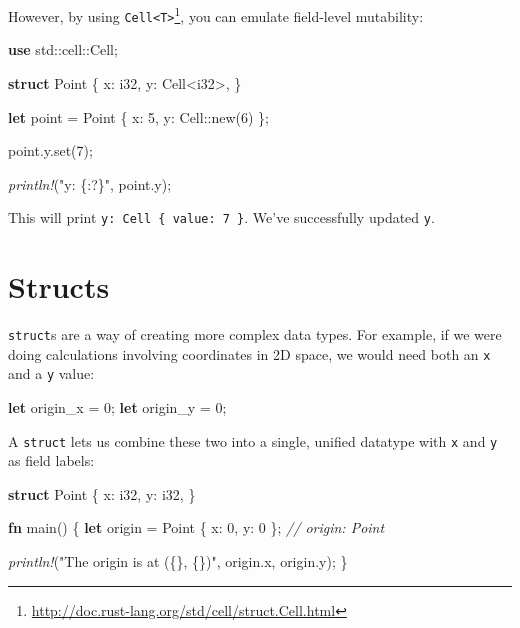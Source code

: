 \documentclass[a4paper,]{book}
\newenvironment{Shaded}{\begin{snugshade}}{\end{snugshade}}
\newcommand{\KeywordTok}[1]{\textcolor[rgb]{0.13,0.29,0.53}{\textbf{{#1}}}}
\newcommand{\DataTypeTok}[1]{\textcolor[rgb]{0.13,0.29,0.53}{{#1}}}
\newcommand{\DecValTok}[1]{\textcolor[rgb]{0.00,0.00,0.81}{{#1}}}
\newcommand{\StringTok}[1]{\textcolor[rgb]{0.31,0.60,0.02}{{#1}}}
\newcommand{\CommentTok}[1]{\textcolor[rgb]{0.56,0.35,0.01}{\textit{{#1}}}}
\newcommand{\PreprocessorTok}[1]{\textcolor[rgb]{0.56,0.35,0.01}{\textit{{#1}}}}
\newcommand{\NormalTok}[1]{{#1}}
\renewcommand{\href}[2]{#2\footnote{\url{#1}}}
\begin{document}
However, by using
\href{http://doc.rust-lang.org/std/cell/struct.Cell.html}{\texttt{Cell\textless{}T\textgreater{}}},
you can emulate field-level mutability:

\begin{Shaded}
\begin{Highlighting}[]
\KeywordTok{use} \NormalTok{std::cell::Cell;}

\KeywordTok{struct} \NormalTok{Point \{}
    \NormalTok{x: }\DataTypeTok{i32}\NormalTok{,}
    \NormalTok{y: Cell<}\DataTypeTok{i32}\NormalTok{>,}
\NormalTok{\}}

\KeywordTok{let} \NormalTok{point = Point \{ x: }\DecValTok{5}\NormalTok{, y: Cell::new(}\DecValTok{6}\NormalTok{) \};}

\NormalTok{point.y.set(}\DecValTok{7}\NormalTok{);}

\PreprocessorTok{println!}\NormalTok{(}\StringTok{"y: \{:?\}"}\NormalTok{, point.y);}
\end{Highlighting}
\end{Shaded}

This will print \texttt{y:\ Cell\ \{\ value:\ 7\ \}}. We've successfully
updated \texttt{y}.

\hypertarget{sec--structs}{\section{Structs}\label{sec--structs}}

\texttt{struct}s are a way of creating more complex data types. For
example, if we were doing calculations involving coordinates in 2D
space, we would need both an \texttt{x} and a \texttt{y} value:

\begin{Shaded}
\begin{Highlighting}[]
\KeywordTok{let} \NormalTok{origin_x = }\DecValTok{0}\NormalTok{;}
\KeywordTok{let} \NormalTok{origin_y = }\DecValTok{0}\NormalTok{;}
\end{Highlighting}
\end{Shaded}

A \texttt{struct} lets us combine these two into a single, unified
datatype with \texttt{x} and \texttt{y} as field labels:

\begin{Shaded}
\begin{Highlighting}[]
\KeywordTok{struct} \NormalTok{Point \{}
    \NormalTok{x: }\DataTypeTok{i32}\NormalTok{,}
    \NormalTok{y: }\DataTypeTok{i32}\NormalTok{,}
\NormalTok{\}}

\KeywordTok{fn} \NormalTok{main() \{}
    \KeywordTok{let} \NormalTok{origin = Point \{ x: }\DecValTok{0}\NormalTok{, y: }\DecValTok{0} \NormalTok{\}; }\CommentTok{// origin: Point}

    \PreprocessorTok{println!}\NormalTok{(}\StringTok{"The origin is at (\{\}, \{\})"}\NormalTok{, origin.x, origin.y);}
\NormalTok{\}}
\end{Highlighting}
\end{Shaded}
\end{document}
